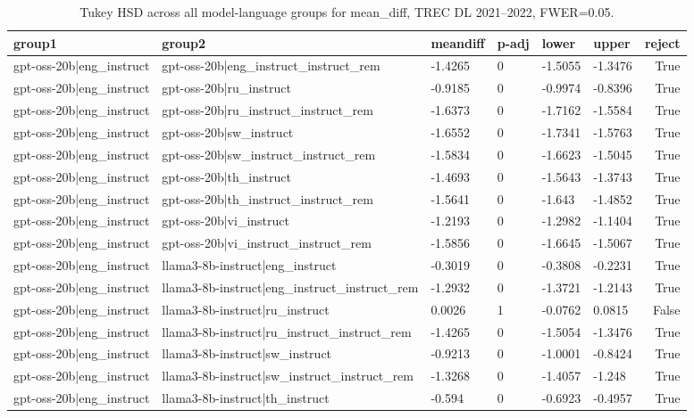 \begin{table}
\caption{Tukey HSD across all model-language groups for mean_diff, TREC DL 2021--2022, FWER=0.05.}
\label{tab:tukey_all_models_all_langs_2021_2022_mean_diff}
\begin{tabular}{llllllr}
\toprule
group1 & group2 & meandiff & p-adj & lower & upper & reject \\
\midrule
gpt-oss-20b|eng_instruct & gpt-oss-20b|eng_instruct_instruct_rem & -1.4265 & 0 & -1.5055 & -1.3476 & True \\
gpt-oss-20b|eng_instruct & gpt-oss-20b|ru_instruct & -0.9185 & 0 & -0.9974 & -0.8396 & True \\
gpt-oss-20b|eng_instruct & gpt-oss-20b|ru_instruct_instruct_rem & -1.6373 & 0 & -1.7162 & -1.5584 & True \\
gpt-oss-20b|eng_instruct & gpt-oss-20b|sw_instruct & -1.6552 & 0 & -1.7341 & -1.5763 & True \\
gpt-oss-20b|eng_instruct & gpt-oss-20b|sw_instruct_instruct_rem & -1.5834 & 0 & -1.6623 & -1.5045 & True \\
gpt-oss-20b|eng_instruct & gpt-oss-20b|th_instruct & -1.4693 & 0 & -1.5643 & -1.3743 & True \\
gpt-oss-20b|eng_instruct & gpt-oss-20b|th_instruct_instruct_rem & -1.5641 & 0 & -1.643 & -1.4852 & True \\
gpt-oss-20b|eng_instruct & gpt-oss-20b|vi_instruct & -1.2193 & 0 & -1.2982 & -1.1404 & True \\
gpt-oss-20b|eng_instruct & gpt-oss-20b|vi_instruct_instruct_rem & -1.5856 & 0 & -1.6645 & -1.5067 & True \\
gpt-oss-20b|eng_instruct & llama3-8b-instruct|eng_instruct & -0.3019 & 0 & -0.3808 & -0.2231 & True \\
gpt-oss-20b|eng_instruct & llama3-8b-instruct|eng_instruct_instruct_rem & -1.2932 & 0 & -1.3721 & -1.2143 & True \\
gpt-oss-20b|eng_instruct & llama3-8b-instruct|ru_instruct & 0.0026 & 1 & -0.0762 & 0.0815 & False \\
gpt-oss-20b|eng_instruct & llama3-8b-instruct|ru_instruct_instruct_rem & -1.4265 & 0 & -1.5054 & -1.3476 & True \\
gpt-oss-20b|eng_instruct & llama3-8b-instruct|sw_instruct & -0.9213 & 0 & -1.0001 & -0.8424 & True \\
gpt-oss-20b|eng_instruct & llama3-8b-instruct|sw_instruct_instruct_rem & -1.3268 & 0 & -1.4057 & -1.248 & True \\
gpt-oss-20b|eng_instruct & llama3-8b-instruct|th_instruct & -0.594 & 0 & -0.6923 & -0.4957 & True \\

\end{tabular}
\end{table}
